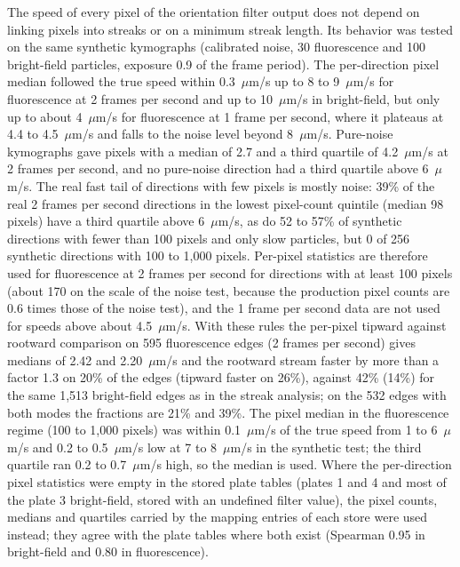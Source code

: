 The speed of every pixel of the orientation filter output does not depend on linking pixels into streaks or on a minimum streak length.
Its behavior was tested on the same synthetic kymographs (calibrated noise, 30 fluorescence and 100 bright-field particles, exposure 0.9 of the frame period).
The per-direction pixel median followed the true speed within 0.3~$\mu$m/s up to 8 to 9~$\mu$m/s for fluorescence at 2 frames per second and up to 10~$\mu$m/s in bright-field, but only up to about 4~$\mu$m/s for fluorescence at 1 frame per second, where it plateaus at 4.4 to 4.5~$\mu$m/s and falls to the noise level beyond 8~$\mu$m/s.
Pure-noise kymographs gave pixels with a median of 2.7 and a third quartile of 4.2~$\mu$m/s at 2 frames per second, and no pure-noise direction had a third quartile above 6~$\mu$m/s.
The real fast tail of directions with few pixels is mostly noise: 39\% of the real 2 frames per second directions in the lowest pixel-count quintile (median 98 pixels) have a third quartile above 6~$\mu$m/s, as do 52 to 57\% of synthetic directions with fewer than 100 pixels and only slow particles, but 0 of 256 synthetic directions with 100 to 1,000 pixels.
Per-pixel statistics are therefore used for fluorescence at 2 frames per second for directions with at least 100 pixels (about 170 on the scale of the noise test, because the production pixel counts are 0.6 times those of the noise test), and the 1 frame per second data are not used for speeds above about 4.5~$\mu$m/s.
With these rules the per-pixel tipward against rootward comparison on 595 fluorescence edges (2 frames per second) gives medians of 2.42 and 2.20~$\mu$m/s and the rootward stream faster by more than a factor 1.3 on 20\% of the edges (tipward faster on 26\%), against 42\% (14\%) for the same 1,513 bright-field edges as in the streak analysis; on the 532 edges with both modes the fractions are 21\% and 39\%.
The pixel median in the fluorescence regime (100 to 1,000 pixels) was within 0.1~$\mu$m/s of the true speed from 1 to 6~$\mu$m/s and 0.2 to 0.5~$\mu$m/s low at 7 to 8~$\mu$m/s in the synthetic test; the third quartile ran 0.2 to 0.7~$\mu$m/s high, so the median is used.
Where the per-direction pixel statistics were empty in the stored plate tables (plates 1 and 4 and most of the plate 3 bright-field, stored with an undefined filter value), the pixel counts, medians and quartiles carried by the mapping entries of each store were used instead; they agree with the plate tables where both exist (Spearman 0.95 in bright-field and 0.80 in fluorescence).

